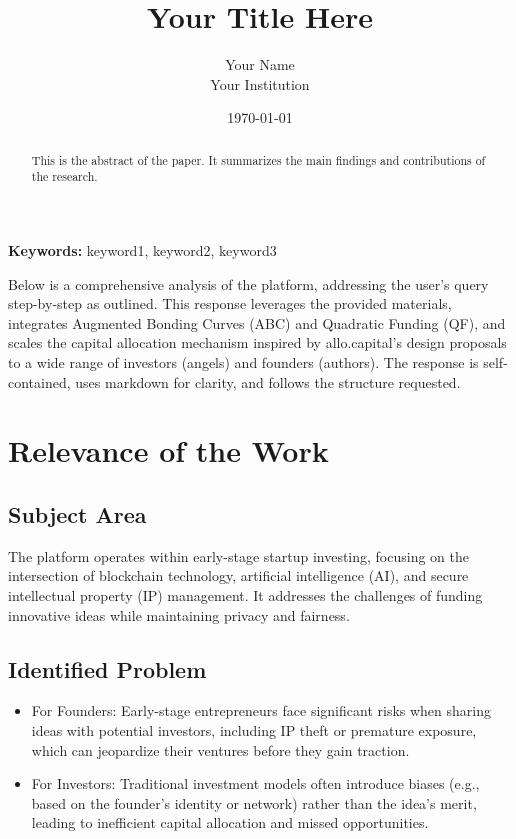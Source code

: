 \documentclass[12pt]{article}
\begin{document}
\title{Your Title Here}
\author{Your Name \\ Your Institution}
\date{\today}
\maketitle

\begin{abstract}
    This is the abstract of the paper. It summarizes the main findings and contributions of the research.
\end{abstract}

\textbf{Keywords:} keyword1, keyword2, keyword3

Below is a comprehensive analysis of the platform, addressing the user's query step-by-step as outlined. This response leverages the provided materials, integrates Augmented Bonding Curves (ABC) and Quadratic Funding (QF), and scales the capital allocation mechanism inspired by allo.capital's design proposals to a wide range of investors (angels) and founders (authors). The response is self-contained, uses markdown for clarity, and follows the structure requested.

\section{Relevance of the Work}

\subsection{Subject Area}
The platform operates within early-stage startup investing, focusing on the intersection of blockchain technology, artificial intelligence (AI), and secure intellectual property (IP) management. It addresses the challenges of funding innovative ideas while maintaining privacy and fairness.

\subsection{Identified Problem}
\begin{itemize}
    \item For Founders: Early-stage entrepreneurs face significant risks when sharing ideas with potential investors, including IP theft or premature exposure, which can jeopardize their ventures before they gain traction.
    \item For Investors: Traditional investment models often introduce biases (e.g., based on the founder's identity or network) rather than the idea's merit, leading to inefficient capital allocation and missed opportunities.
\end{itemize}
\end{document}

